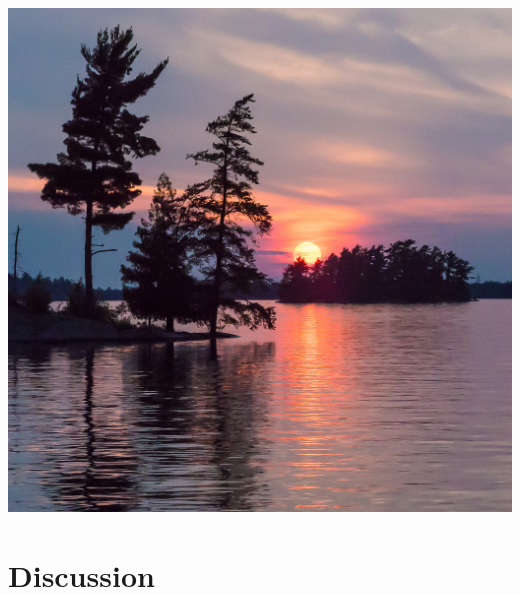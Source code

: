 \documentclass[compress,english]{beamer}
\begin{document}
{\usebackgroundtemplate%
	{\includegraphics[width=\paperwidth]{FloodedSunset}}
\section{Discussion}
}

\end{document}

